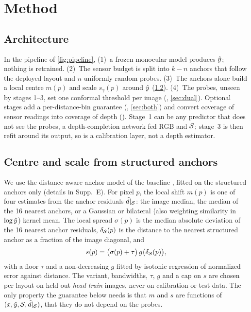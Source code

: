 \section{Method}
\label{sec:method}



\subsection{Architecture}
\label{sec:arch}
In the pipeline of \cref{fig:pipeline},
(1)~a frozen monocular model produces $\hat{y}$; nothing is retrained.
(2)~The sensor budget is split into $k-n$ anchors that follow the deployed layout and $n$ uniformly random probes.
(3)~The anchors alone build a local centre $m(p)$ and scale $s_\gamma(p)$ around $\hat{y}$ (\cref{sec:centre}).
(4)~The probes, unseen by stages 1--3, set one conformal threshold per image (\mDual, \cref{sec:dual}).
Optional stages add a per-distance-bin guarantee (\mDualBoth, \cref{sec:both}) and convert coverage of sensor readings into coverage of depth (\envref).
Stage~1 can be any predictor that does not see the probes, \eg a depth-completion network fed RGB and $\mathcal{S}$; stage~3 is then refit around its output, so \mDual is a calibration layer, not a depth estimator.

\subsection{Centre and scale from structured anchors}
\label{sec:centre}
We use the distance-aware anchor model of the baseline \mDistSplit, fitted on the structured anchors only (details in Supp.~E).
For pixel $p$, the local shift $m(p)$ is one of four estimates from the anchor residuals $\tilde{d}|_{\mathcal{S}}$: the image median, the median of the 16 nearest anchors, or a Gaussian or bilateral (also weighting similarity in $\log\hat{y}$) kernel mean.
The local spread $\sigma(p)$ is the median absolute deviation of the 16 nearest anchor residuals, $\delta_{\mathcal{S}}(p)$ is the distance to the nearest structured anchor as a fraction of the image diagonal, and
\begin{equation}
s(p)=\big(\sigma(p)+\tau\big)\,g\big(\delta_{\mathcal{S}}(p)\big),
\label{eq:scale}
\end{equation}
with a floor $\tau$ and a non-decreasing $g$ fitted by isotonic regression of normalized error against distance.
The variant, bandwidths, $\tau$, $g$ and a cap on $s$ are chosen per layout on held-out \emph{head-train} images, never on calibration or test data.
The only property the guarantee below needs is that $m$ and $s$ are functions of $(x,\hat{y},\mathcal{S},\tilde{d}|_{\mathcal{S}})$, \ie that they do not depend on the probes.


